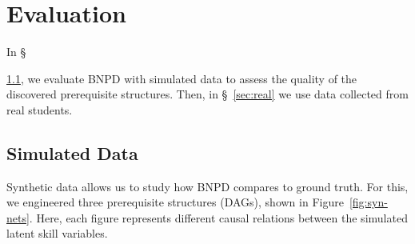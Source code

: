 \documentclass{edm_template}
\begin{document}
\section{Evaluation}
In \S~{\ref{sec:synthetic}, we  evaluate BNPD with simulated data  to assess the quality of the discovered prerequisite structures.
Then, in \S~\ref{sec:real} we  use  data collected from real students.
	
	
	\subsection{Simulated Data}
	\label{sec:synthetic}
	
	Synthetic data allows us to study how BNPD compares to ground truth.
	For this, we engineered three prerequisite structures (DAGs), shown in Figure~\ref{fig:syn-nets}.
	Here, each figure represents different causal relations between the simulated latent skill variables.
	
}
\end{document}
